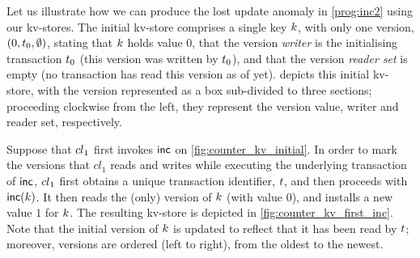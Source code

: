 
Let us illustrate how we can produce the lost update anomaly in \eqref{prog:inc2} using our kv-stores. 
The initial kv-store comprises a single key $k$, with only one 
version, $(0, t_{0}, \emptyset)$, stating that $k$ holds value $0$, 
that the version \emph{writer} is the initialising transaction $t_0$ (this version was written by $t_0$), 
and that the version \emph{reader set} is empty (no transaction has read this version as of yet). 
 depicts this initial kv-store, with the version
represented as a box sub-divided to three sections;
proceeding clockwise from the left, they represent the version value, writer and reader set, respectively.

Suppose that ${cl}_1$ first invokes $\mathsf{inc}$ on \cref{fig:counter_kv_initial}. 
In order to mark the versions that $cl_1$ reads and writes while executing the underlying transaction of $\mathsf{inc}$,  
${cl}_1$ first obtains a unique transaction identifier, $t$, 
and then proceeds with $\mathsf{inc}(k)$. 
It then reads the (only) version of $k$ (with value $0$), 
and installs a new value $1$ for $k$. 
The resulting kv-store is depicted in \cref{fig:counter_kv_first_inc}.
Note that the initial version of $k$ is updated to reflect that it has been read by $t$; 
moreover, versions are ordered (left to right), from the oldest to the newest.

